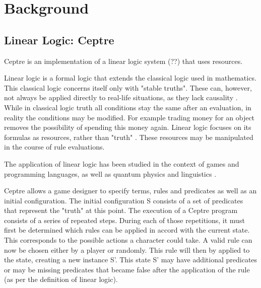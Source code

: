 \section{Background} \label{background}

\subsection{Linear Logic: Ceptre} \label{linear_logic}

Ceptre is an implementation of a linear logic system (??) that uses resources.

Linear logic is a formal logic that extends the classical logic used in mathematics.
This classical logic concerns itself only with "stable truths".
These can, however, not always be applied directly to real-life situations, as they lack causality \cite{girard_1995}.
While in classical logic truth all conditions stay the same after an evaluation, in reality the conditions may be modified.
For example trading money for an object removes the possibility of spending this money again.
Linear logic focuses on its formulas as resources, rather than "truth" \cite{sep-logic-linear}.
These resources may be manipulated in the course of rule evaluations.

The application of linear logic has been studied in the context of games and programming languages, as well as quantum physics and linguistics \cite{sep-logic-linear}. 

Ceptre allows a game designer to specify terms, rules and predicates as well as an initial configuration.
The initial configuration S consists of a set of predicates that represent the "truth" at this point.
The execution of a Ceptre program consists of a series of repeated steps.
During each of those repetitions, it must first be determined which rules can be applied in accord with the current state.
This corresponds to the possible actions a character could take.
A valid rule can now be chosen either by a player or randomly. 
This rule will then by applied to the state, creating a new instance S'.
This state S' may have additional predicates or may be missing predicates that became false after the application of the rule (as per the definition of linear logic).


